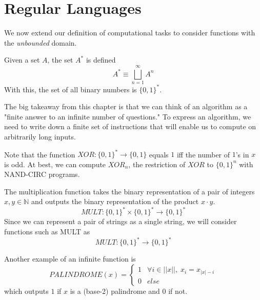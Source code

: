 \section{Regular Languages}  

  We now extend our definition of computational tasks to consider functions with the \textit{unbounded} domain. 

  \begin{definition}
    Given a set $A$, the set $A^\ast$ is defined 
    \begin{equation}
      A^\ast \equiv \bigsqcup_{n=1}^\infty A^n
    \end{equation}   
    With this, the set of all binary numbers is $\{0,1\}^\ast$. 
  \end{definition}

  The big takeaway from this chapter is that we can think of an algorithm as a "finite answer to an infinite number of questions." To express an algorithm, we need to write down a finite set of instructions that will enable us to compute on arbitrarily long inputs. 

  \begin{example}
    Note that the function $XOR: \{0,1\}^* \longrightarrow \{0,1\}$ equals $1$ iff the number of $1$'s in $x$ is odd. At best, we can compute $XOR_n$, the restriction of $XOR$ to $\{0,1\}^n$ with NAND-CIRC programs. 
  \end{example}

  \begin{example}
    The multiplication function takes the binary representation of a pair of integers $x, y \in \mathbb{N}$ and outputs the binary representation of the product $x \cdot y$. 
    \[MULT: \{0,1\}^* \times \{0,1\}^* \longrightarrow \{0,1\}^*\]
    Since we can represent a pair of strings as a single string, we will consider functions such as MULT as
    \[MULT: \{0,1\}^* \longrightarrow \{0,1\}^*\]
  \end{example}

  \begin{example}
    Another example of an infinite function is 
    \[PALINDROME (x) = \begin{cases}
    1 & \forall i \in ||x||, \; x_i = x_{|x|-i} \\
    0 & else
    \end{cases}\]
    which outputs $1$ if $x$ is a (base-2) palindrome and $0$ if not. 
  \end{example}

